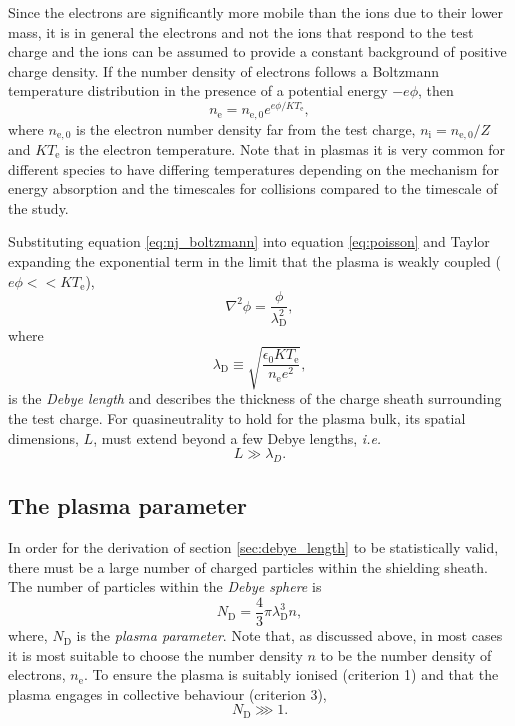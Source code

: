 Since the electrons are significantly more mobile than the ions due to their lower mass, it is in general the electrons and not the ions that respond to the test charge and the ions can be assumed to provide a constant background of positive charge density.
If the number density of electrons follows a Boltzmann temperature distribution in the presence of a potential energy $-e\phi$, then
\begin{equation}\label{eq:nj_boltzmann}
	n_\mathrm{e}= n_{\mathrm{e},0}e^{e\phi/KT_\mathrm{e}},
\end{equation}
where $n_{\mathrm{e},0}$ is the electron number density far from the test charge, $n_\mathrm{i} = n_{\mathrm{e},0}/Z$ and $KT_\mathrm{e}$ is the electron temperature. Note that in plasmas it is very common for different species to have differing temperatures depending on the mechanism for energy absorption and the timescales for collisions compared to the timescale of the study.

Substituting equation \ref{eq:nj_boltzmann} into equation \ref{eq:poisson} and Taylor expanding the exponential term in the limit that the plasma is weakly coupled ($e\phi << KT_\mathrm{e}$), 
\begin{equation}\label{eq:poisson_debye2}
	\nabla^2\phi = \frac{\phi}{\lambda_\mathrm{D}^2},
\end{equation}
where
\begin{equation}\label{eq:debye}
	\lambda_\mathrm{D} \equiv \sqrt{\frac{\epsilon_0KT_\mathrm{e}}{n_\mathrm{e}e^2}},
\end{equation}
is the \textit{Debye length} and describes the thickness of the charge sheath surrounding the test charge. For quasineutrality to hold for the plasma bulk, its spatial dimensions, $L$, must extend beyond a few Debye lengths, \textit{i.e.}
\begin{equation}
	L \gg \lambda_D.
\end{equation}

\subsection{\label{sec:plasma_parameter}The plasma parameter}
In order for the derivation of section \ref{sec:debye_length} to be statistically valid, there must be a large number of charged particles within the shielding sheath. The number of particles within the \textit{Debye sphere} is
\begin{equation}\label{eq:plasma_parameter}
	N_\mathrm{D} = \frac{4}{3}\pi\lambda_\mathrm{D}^3n,
\end{equation}
where, $N_\mathrm{D}$ is the \textit{plasma parameter}. Note that, as discussed above, in most cases it is most suitable to choose the number density $n$ to be the number density of electrons, $n_\mathrm{e}$. To ensure the plasma is suitably ionised (criterion 1) and that the plasma engages in collective behaviour (criterion 3),
\begin{equation}\label{eq:plasma_parameter_condition}
	N_\mathrm{D} \ggg 1.
\end{equation}

